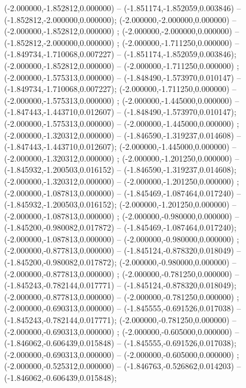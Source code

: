  (-2.000000,-1.852812,0.000000) -- (-1.851174,-1.852059,0.003846) -- (-1.852812,-2.000000,0.000000);
 (-2.000000,-2.000000,0.000000) -- (-2.000000,-1.852812,0.000000) ;
 (-2.000000,-2.000000,0.000000) -- (-1.852812,-2.000000,0.000000) ;
 (-2.000000,-1.711250,0.000000) -- (-1.849734,-1.710068,0.007227) -- (-1.851174,-1.852059,0.003846);
 (-2.000000,-1.852812,0.000000) -- (-2.000000,-1.711250,0.000000) ;
 (-2.000000,-1.575313,0.000000) -- (-1.848490,-1.573970,0.010147) -- (-1.849734,-1.710068,0.007227);
 (-2.000000,-1.711250,0.000000) -- (-2.000000,-1.575313,0.000000) ;
 (-2.000000,-1.445000,0.000000) -- (-1.847443,-1.443710,0.012607) -- (-1.848490,-1.573970,0.010147);
 (-2.000000,-1.575313,0.000000) -- (-2.000000,-1.445000,0.000000) ;
 (-2.000000,-1.320312,0.000000) -- (-1.846590,-1.319237,0.014608) -- (-1.847443,-1.443710,0.012607);
 (-2.000000,-1.445000,0.000000) -- (-2.000000,-1.320312,0.000000) ;
 (-2.000000,-1.201250,0.000000) -- (-1.845932,-1.200503,0.016152) -- (-1.846590,-1.319237,0.014608);
 (-2.000000,-1.320312,0.000000) -- (-2.000000,-1.201250,0.000000) ;
 (-2.000000,-1.087813,0.000000) -- (-1.845469,-1.087464,0.017240) -- (-1.845932,-1.200503,0.016152);
 (-2.000000,-1.201250,0.000000) -- (-2.000000,-1.087813,0.000000) ;
 (-2.000000,-0.980000,0.000000) -- (-1.845200,-0.980082,0.017872) -- (-1.845469,-1.087464,0.017240);
 (-2.000000,-1.087813,0.000000) -- (-2.000000,-0.980000,0.000000) ;
 (-2.000000,-0.877813,0.000000) -- (-1.845124,-0.878320,0.018049) -- (-1.845200,-0.980082,0.017872);
 (-2.000000,-0.980000,0.000000) -- (-2.000000,-0.877813,0.000000) ;
 (-2.000000,-0.781250,0.000000) -- (-1.845243,-0.782144,0.017771) -- (-1.845124,-0.878320,0.018049);
 (-2.000000,-0.877813,0.000000) -- (-2.000000,-0.781250,0.000000) ;
 (-2.000000,-0.690313,0.000000) -- (-1.845555,-0.691526,0.017038) -- (-1.845243,-0.782144,0.017771);
 (-2.000000,-0.781250,0.000000) -- (-2.000000,-0.690313,0.000000) ;
 (-2.000000,-0.605000,0.000000) -- (-1.846062,-0.606439,0.015848) -- (-1.845555,-0.691526,0.017038);
 (-2.000000,-0.690313,0.000000) -- (-2.000000,-0.605000,0.000000) ;
 (-2.000000,-0.525312,0.000000) -- (-1.846763,-0.526862,0.014203) -- (-1.846062,-0.606439,0.015848);
